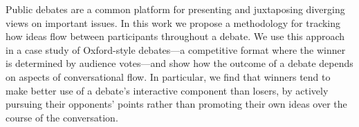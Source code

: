 Public debates are a common platform for presenting and juxtaposing diverging views on important issues. In this work we propose a methodology for tracking how ideas flow between participants throughout a debate. We use this approach in a case study of Oxford-style debates—a competitive format where the winner is determined by audience votes—and show how the outcome of a debate depends on aspects of conversational flow. In particular, we find that winners tend to make better use of a debate's interactive component than losers, by actively pursuing their opponents' points rather than promoting their own ideas over the course of the conversation.
